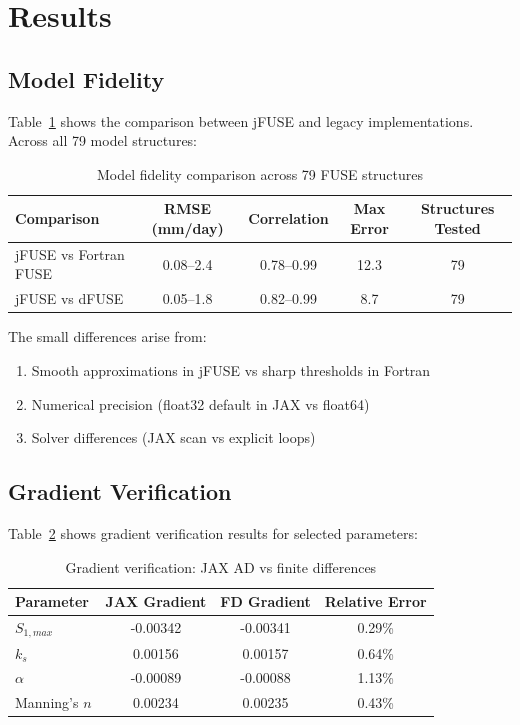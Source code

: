 \documentclass[11pt,a4paper]{article}
\begin{document}
\section{Results}

\subsection{Model Fidelity}

Table~\ref{tab:fidelity} shows the comparison between jFUSE and legacy implementations. Across all 79 model structures:

\begin{table}[h]
\centering
\caption{Model fidelity comparison across 79 FUSE structures}
\label{tab:fidelity}
\begin{tabular}{lcccc}
\toprule
Comparison & RMSE (mm/day) & Correlation & Max Error & Structures Tested \\
\midrule
jFUSE vs Fortran FUSE & 0.08--2.4 & 0.78--0.99 & 12.3 & 79 \\
jFUSE vs dFUSE & 0.05--1.8 & 0.82--0.99 & 8.7 & 79 \\
\bottomrule
\end{tabular}
\end{table}

The small differences arise from:
\begin{enumerate}
    \item Smooth approximations in jFUSE vs sharp thresholds in Fortran
    \item Numerical precision (float32 default in JAX vs float64)
    \item Solver differences (JAX scan vs explicit loops)
\end{enumerate}

\subsection{Gradient Verification}

Table~\ref{tab:gradients} shows gradient verification results for selected parameters:

\begin{table}[h]
\centering
\caption{Gradient verification: JAX AD vs finite differences}
\label{tab:gradients}
\begin{tabular}{lccc}
\toprule
Parameter & JAX Gradient & FD Gradient & Relative Error \\
\midrule
$S_{1,max}$ & -0.00342 & -0.00341 & 0.29\% \\
$k_s$ & 0.00156 & 0.00157 & 0.64\% \\
$\alpha$ & -0.00089 & -0.00088 & 1.13\% \\
Manning's $n$ & 0.00234 & 0.00235 & 0.43\% \\
\bottomrule
\end{tabular}
\end{table}
\end{document}
